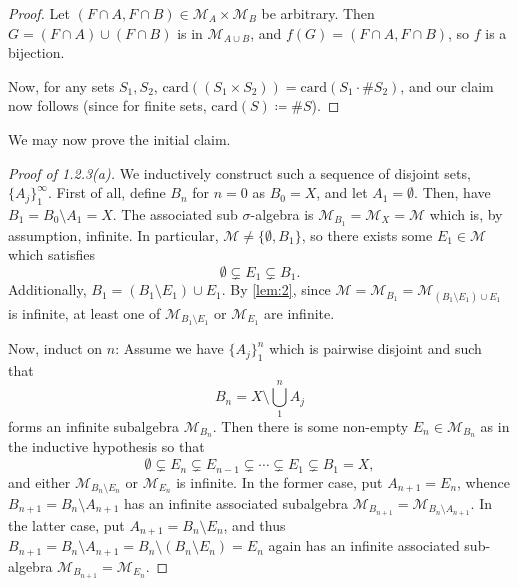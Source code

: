 \documentclass[12pt]{article}
\newenvironment{problem}[2][Problem]{\begin{trivlist}
    \item[\hskip \labelsep {\bfseries #1}\hskip \labelsep {\bfseries #2.}]}{\end{trivlist}}
\theoremstyle{definition}
\begin{document}
\begin{problem}{1.2.3}
\begin{enumerate}[label=(\alph*)]
\begin{proof}
            Let \( (F \cap A, F \cap B) \in \mathcal{M}_A \times \mathcal{M}_B \) be arbitrary.
            Then \( G = (F \cap A) \cup (F \cap B) \) is in \( \mathcal{M}_{A \cup B} \), and \( f(G) = (F \cap A, F \cap B) \), so \( f \) is a bijection.

            Now, for any sets \( S_1, S_2 \), \( \text{card}(\left( S_1 \times S_2 \right)) = \text{card}(S_1 \cdot \#S_2) \), and our claim now follows (since for finite sets, \( \text{card}(S) \coloneq \# S \)).
          \end{proof}
          We may now prove the initial claim.
          \begin{proof}[Proof of 1.2.3(a)]
            We inductively construct such a sequence of disjoint sets, \( \{A_j\}_1^{\infty} \).
            First of all, define \( B_n \) for \( n=0 \) as \( B_0  = X \), and let \( A_1 = \emptyset \).
            Then, have \( B_1 = B_0 \setminus A_1 = X \).
            The associated sub \( \sigma \)-algebra is \( \mathcal{M}_{B_1} = \mathcal{M}_X = \mathcal{M} \) which is, by assumption, infinite.
            In particular, \( \mathcal{M} \neq \{\emptyset, B_1\} \), so there exists some \( E_1 \in \mathcal{M} \) which satisfies
            \begin{equation}
            \label{eq:43}
            \emptyset \subsetneq E_{1} \subsetneq B_1.
            \end{equation}
            Additionally, \( B_1 = (B_1 \setminus E_1) \cup E_1 \).
            By \cref{lem:2}, since \( \mathcal{M} = \mathcal{M}_{B_1} = \mathcal{M}_{(B_1 \setminus E_{1}) \cup E_1} \) is infinite, at least one of \( \mathcal{M}_{B_1 \setminus E_1} \) or \( \mathcal{M}_{E_1} \) are infinite.

            Now, induct on \( n \): Assume we have \( \{ A_j \}_1^n \) which is pairwise disjoint and such that
            \begin{equation}
            \label{eq:45}
            B_n = X \setminus \bigcup_{1}^n A_j
            \end{equation}
            forms an infinite subalgebra \( \mathcal{M}_{B_n} \).
            Then there is some non-empty \( E_{n} \in \mathcal{M}_{B_n} \) as in the inductive hypothesis so that
            \begin{equation}
            \label{eq:46}
            \emptyset \subsetneq E_n \subsetneq E_{n-1} \subsetneq \cdots \subsetneq E_1 \subsetneq B_1 = X,
            \end{equation}
            and either \( \mathcal{M}_{B_n \setminus E_{n}} \) or \( \mathcal{M}_{E_{n}} \) is infinite.
            In the former case, put \( A_{n+1} =  E_{n} \), whence \( B_{n+1} = B_n \setminus A_{n+1} \) has an infinite associated subalgebra \( \mathcal{M}_{B_{n+1}} = \mathcal{M}_{B_n \setminus A_{n+1}} \).
            In the latter case, put \( A_{n+1} = B_n \setminus E_{n} \), and thus \( B_{n+1} = B_n \setminus A_{n+1} = B_n \setminus (B_n \setminus E_{n}) = E_{n} \) again has an infinite associated sub-algebra \( \mathcal{M}_{B_{n+1}} = \mathcal{M}_{E_{n}} \).


\end{proof}
\end{enumerate}
\end{problem}
\end{document}

